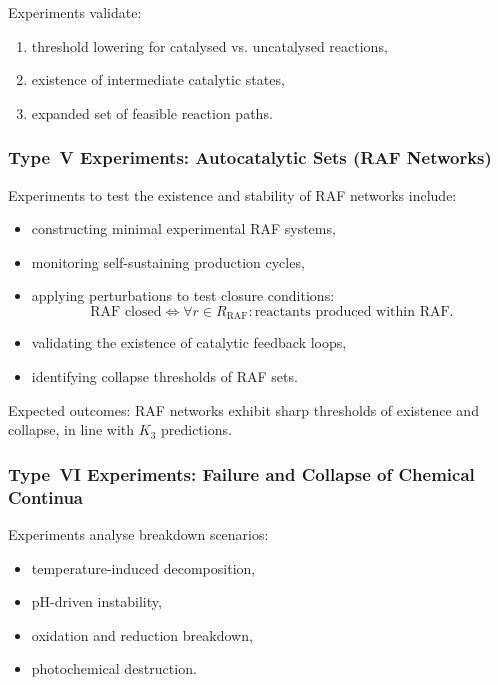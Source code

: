 Experiments validate:

\begin{enumerate}
    \item threshold lowering for catalysed vs. uncatalysed reactions,
    \item existence of intermediate catalytic states,
    \item expanded set of feasible reaction paths.
\end{enumerate}



\subsubsection{Type~V Experiments: Autocatalytic Sets (RAF Networks)}

Experiments to test the existence and stability of RAF networks include:

\begin{itemize}
    \item constructing minimal experimental RAF systems,
    \item monitoring self-sustaining production cycles,
    \item applying perturbations to test closure conditions:
          \[
             \text{RAF closed} 
             \Leftrightarrow 
             \forall r \in R_{\mathrm{RAF}}:
             \text{reactants produced within RAF}.
          \]
    \item validating the existence of catalytic feedback loops,
    \item identifying collapse thresholds of RAF sets.
\end{itemize}

Expected outcomes:  
RAF networks exhibit sharp thresholds of existence and collapse, in line with 
$K_3$ predictions.



\subsubsection{Type~VI Experiments: Failure and Collapse of Chemical Continua}

Experiments analyse breakdown scenarios:

\begin{itemize}
    \item temperature-induced decomposition,
    \item pH-driven instability,
    \item oxidation and reduction breakdown,
    \item photochemical destruction.
\end{itemize}


